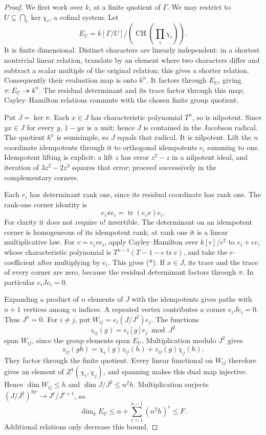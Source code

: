 \begin{proof}
We first work over \(k\), at a finite quotient of \(\Gamma\).
We may restrict to \(U\subseteq\bigcap_i\ker\chi_i\), a cofinal system.
Let
\[
 E_U=k[\Gamma/U]/(\operatorname{CH}(\textstyle\prod_i\chi_i)).
\]
It is finite dimensional. Distinct characters are linearly independent:
in a shortest nontrivial linear relation, translate by an element
where two characters differ and subtract a scalar multiple of the
original relation; this gives a shorter relation.
Consequently their evaluation map is onto \(k^n\).
It factors through \(E_U\), giving \(\pi:E_U\twoheadrightarrow k^n\).
The residual determinant and its trace factor through this map;
Cayley--Hamilton relations commute with the chosen finite group quotient.

Put \(J=\ker\pi\). Each \(x\in J\) has characteristic polynomial
\(T^n\), so is nilpotent. Since \(yx\in J\) for every \(y\),
\(1-yx\) is a unit; hence \(J\) is contained in the Jacobson radical.
The quotient \(k^n\) is semisimple, so \(J\) equals that radical.
It is nilpotent. Lift the \(n\) coordinate idempotents through it
to orthogonal idempotents \(e_i\) summing to one.
Idempotent lifting is explicit: a lift \(z\) has error \(z^2-z\)
in a nilpotent ideal, and iteration of \(3z^2-2z^3\) squares that
error; proceed successively in the complementary corners.

Each \(e_i\) has determinant rank one, since its residual coordinate
has rank one. The rank-one corner identity is
\[
                         e_i x e_i=\operatorname{tr}(e_ix)e_i.
 \tag{*}
\]
For clarity it does not require \(n!\) invertible.
The determinant on an idempotent corner is homogeneous of its
idempotent rank; at rank one it is a linear multiplicative law.
For \(v=e_ive_i\), apply Cayley--Hamilton over \(k[\epsilon]/\epsilon^2\)
to \(e_i+\epsilon v\), whose characteristic polynomial is
\(T^{n-1}(T-1-\epsilon\operatorname{tr}v)\), and take the
\(\epsilon\)-coefficient after multiplying by \(e_i\).
This gives (*). If \(x\in J\), its trace and the trace of every
corner are zero, because the residual determinant factors through
\(\pi\). In particular \(e_iJe_i=0\).

Expanding a product of \(n\) elements of \(J\) with the idempotents
gives paths with \(n+1\) vertices among \(n\) indices.
A repeated vertex contributes a corner \(e_iJe_i=0\).
Thus \(J^n=0\).
For \(i\ne j\), put \(W_{ij}=e_i(J/J^2)e_j\).
The functions
\[
                  z_{ij}(g)=e_i[g]e_j\bmod J^2
\]
span \(W_{ij}\), since the group elements span \(E_U\).
Multiplication modulo \(J^2\) gives
\[
 z_{ij}(gh)=\chi_i(g)z_{ij}(h)+z_{ij}(g)\chi_j(h).
\]
They factor through the finite quotient.
Every linear functional on \(W_{ij}\) therefore gives an element
of \(Z^1(\chi_i,\chi_j)\), and spanning makes this dual map injective.
Hence \(\dim W_{ij}\le h\) and \(\dim J/J^2\le n^2h\).
Multiplication surjects
\((J/J^2)^{\otimes r}\to J^r/J^{r+1}\), so
\[
                 \dim_k E_U
       \le n+\sum_{r=1}^{n-1}(n^2h)^r\le F.
\]
Additional relations only decrease this bound.


\end{proof}
